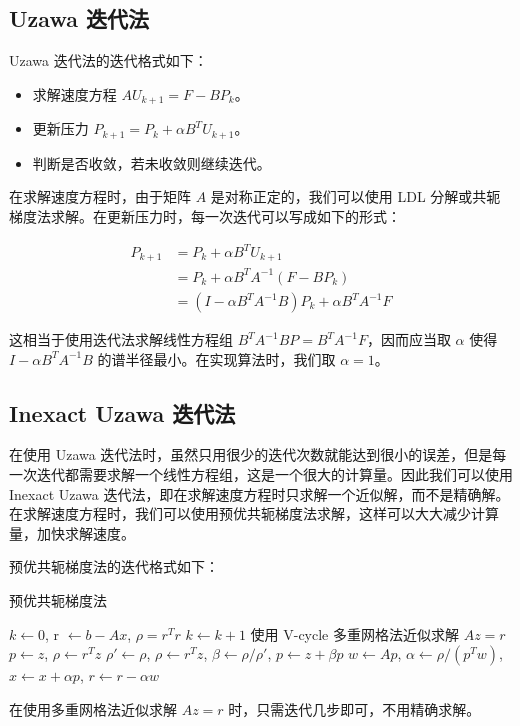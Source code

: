 \documentclass{article}
\begin{document}
\subsection{Uzawa 迭代法}

Uzawa 迭代法的迭代格式如下：

\begin{itemize}
    \item 求解速度方程 $AU_{k+1}=F-BP_{k}$。
    \item 更新压力 $P_{k+1}=P_{k}+\alpha B^T U_{k+1}$。
    \item 判断是否收敛，若未收敛则继续迭代。
\end{itemize}

在求解速度方程时，由于矩阵 $A$ 是对称正定的，我们可以使用 LDL 分解或共轭梯度法求解。在更新压力时，每一次迭代可以写成如下的形式：

\begin{equation*}
    \begin{aligned}
        P_{k+1} &= P_{k} + \alpha B^T U_{k+1} \\
        &= P_{k} + \alpha B^T A^{-1} (F-BP_{k}) \\
        &= (I-\alpha B^T A^{-1} B)P_{k} + \alpha B^T A^{-1} F
    \end{aligned}
\end{equation*}

这相当于使用迭代法求解线性方程组 $B^T A^{-1} B P = B^T A^{-1} F$，因而应当取 $\alpha$ 使得 $I-\alpha B^T A^{-1} B$ 的谱半径最小。在实现算法时，我们取 $\alpha=1$。

\subsection{Inexact Uzawa 迭代法}

在使用 Uzawa 迭代法时，虽然只用很少的迭代次数就能达到很小的误差，但是每一次迭代都需要求解一个线性方程组，这是一个很大的计算量。因此我们可以使用 Inexact Uzawa 迭代法，即在求解速度方程时只求解一个近似解，而不是精确解。在求解速度方程时，我们可以使用预优共轭梯度法求解，这样可以大大减少计算量，加快求解速度。

预优共轭梯度法的迭代格式如下：
\begin{algorithm}
    \caption{预优共轭梯度法}
    \begin{algorithmic}
        \State $k \gets 0$, r $\gets b-Ax$, $\rho=r^T r$
        \State $k \gets k+1$
        \State 使用 V-cycle 多重网格法近似求解 $Az = r$
        \State $p \gets z$, $\rho \gets r^T z$
        \Else
        \State $\rho' \gets \rho$, $\rho \gets r^T z$, $\beta \gets \rho/\rho'$, $p \gets z+\beta p$
        \EndIf
        \State $w \gets Ap$, $\alpha \gets \rho/(p^T w)$, $x \gets x+\alpha p$, $r \gets r-\alpha w$
        \EndWhile
    \end{algorithmic}
    \label{alg:pcg}
\end{algorithm}
\newline
在使用多重网格法近似求解 $Az=r$ 时，只需迭代几步即可，不用精确求解。
\end{document}
